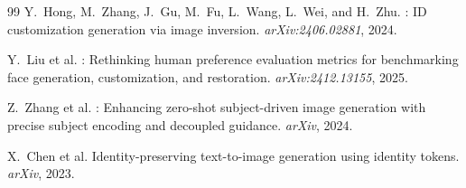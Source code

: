 \documentclass[10pt,twocolumn]{article}
\begin{document}
\begin{thebibliography}{99}
Y.~Hong, M.~Zhang, J.~Gu, M.~Fu, L.~Wang, L.~Wei, and H.~Zhu.
: {ID} customization generation via image inversion.
\newblock \textit{arXiv:2406.02881}, 2024.

Y.~Liu et al.
: Rethinking human preference evaluation metrics for benchmarking face generation, customization, and restoration.
\newblock \textit{arXiv:2412.13155}, 2025.

Z.~Zhang et al.
: Enhancing zero-shot subject-driven image generation with precise subject encoding and decoupled guidance.
\newblock \textit{arXiv}, 2024.

X.~Chen et al.
\newblock Identity-preserving text-to-image generation using identity tokens.
\newblock \textit{arXiv}, 2023.

\end{thebibliography}
\end{document}
